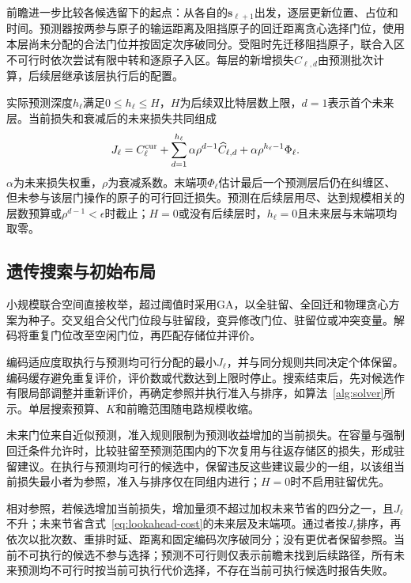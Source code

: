 前瞻进一步比较各候选留下的起点：从各自的$\mathbf{s}_{\ell+1}$出发，逐层更新位置、占位和时间。预测器按两参与原子的输运距离及阻挡原子的回迁距离贪心选择门位，使用本层尚未分配的合法门位并按固定次序破同分。受阻时先迁移阻挡原子，联合入区不可行时依次尝试有限中转和逐原子入区。每层的新增损失$\widehat C_{\ell,d}$由预测批次计算，后续层继承该层执行后的配置。

实际预测深度$h_\ell$满足$0\le h_\ell\le H$，$H$为后续双比特层数上限，$d=1$表示首个未来层。当前损失和衰减后的未来损失共同组成
\begin{equation}
J_\ell=C_\ell^{\rm cur}
+\sum_{d=1}^{h_\ell}\alpha\rho^{d-1}\widehat C_{\ell,d}
+\alpha\rho^{h_\ell-1}\Phi_\ell .
\label{eq:lookahead-cost}
\end{equation}
$\alpha$为未来损失权重，$\rho$为衰减系数。末端项$\Phi_\ell$估计最后一个预测层后仍在纠缠区、但未参与该层门操作的原子的可行回迁损失。预测在后续层用尽、达到规模相关的层数预算或$\rho^{d-1}<\epsilon$时截止；$H=0$或没有后续层时，$h_\ell=0$且未来层与末端项均取零。

\subsection{遗传搜索与初始布局}
\label{sec:initial-placement}

小规模联合空间直接枚举，超过阈值时采用GA\cite{holland1975adaptation}，以全驻留、全回迁和物理贪心方案为种子。交叉组合父代门位段与驻留段，变异修改门位、驻留位或冲突变量。解码将重复门位改至空闲门位，再匹配存储位并评价。

编码适应度取执行与预测均可行分配的最小$J_\ell$，并与同分规则共同决定个体保留。编码缓存避免重复评价，评价数或代数达到上限时停止。搜索结束后，先对候选作有限局部调整并重新评价，再确定参照并执行准入与排序，如算法~\ref{alg:solver}所示。单层搜索预算、$K$和前瞻范围随电路规模收缩。

未来门位来自近似预测，准入规则限制为预测收益增加的当前损失。在容量与强制回迁条件允许时，比较驻留至预测范围内的下次复用与往返存储区的损失，形成驻留建议。在执行与预测均可行的候选中，保留违反这些建议最少的一组，以该组当前损失最小者为参照，准入与排序仅在同组内进行；$H=0$时不启用驻留优先。

相对参照，若候选增加当前损失，增加量须不超过加权未来节省的四分之一，且$J_\ell$不升；未来节省含式~\eqref{eq:lookahead-cost}的未来层及末端项。通过者按$J_\ell$排序，再依次以批次数、重排时延、距离和固定编码次序破同分；没有更优者保留参照。当前不可执行的候选不参与选择；预测不可行则仅表示前瞻未找到后续路径，所有未来预测均不可行时按当前可执行代价选择，不存在当前可执行候选时报告失败。


